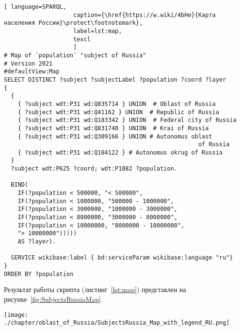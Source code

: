 \begin{lstlisting}[ language=SPARQL, 
                    caption={\href{https://w.wiki/4bHe}{Карта населения России}\protect\footnotemark},
                    label=lst:map,
                    texcl 
                    ]
# Map of `population` "subject of Russia"
# Version 2021
#defaultView:Map
SELECT DISTINCT ?subject ?subjectLabel ?population ?coord ?layer
{
  {
    { ?subject wdt:P31 wd:Q835714 } UNION  # Oblast of Russia
    { ?subject wdt:P31 wd:Q41162 } UNION  # Republic of Russia
    { ?subject wdt:P31 wd:Q183342 } UNION  # Federal city of Russia
    { ?subject wdt:P31 wd:Q831740 } UNION  # Krai of Russia
    { ?subject wdt:P31 wd:Q309166 } UNION # Autonomus oblast 
                                                        of Russia
    { ?subject wdt:P31 wd:Q184122 } # Autonomus okrug of Russia
  }   
  ?subject wdt:P625 ?coord; wdt:P1082 ?population.
  
  BIND(
    IF(?population < 500000, "< 500000",
    IF(?population < 1000000, "500000 - 1000000",
    IF(?population < 3000000, "1000000 - 3000000",
    IF(?population < 8000000, "3000000 - 8000000",
    IF(?population < 10000000, "8000000 - 10000000",
    "> 10000000")))))
    AS ?layer).
  
  SERVICE wikibase:label { bd:serviceParam wikibase:language "ru"}
}
ORDER BY ?population
\end{lstlisting}%

Результат работы скрипта (листинг~\protect\ref{lst:map}) представлен на рисунке~\ref{fig:SubjectsRussiaMap}.

\begin{fullwidth}
\begin{figure*}[h]
	\texttt{[image: ./chapter/oblast\_of\_Russia/SubjectsRussia\_Map\_with\_legend\_RU.png]}
	\caption[Карта численности населения по субъектам России, 2021.]{Карта численности населения по субъектам России, 2021. Субъекты разделёны на шесть групп по количеству населения и отмечены разными цветами в зависимости от группы, в которую субъект входит. Карта построена на основе данных, полученных с помощью запроса~\protect\ref{lst:map}.}%
      \label{fig:SubjectsRussiaMap}%
\end{figure*} 
\end{fullwidth}

